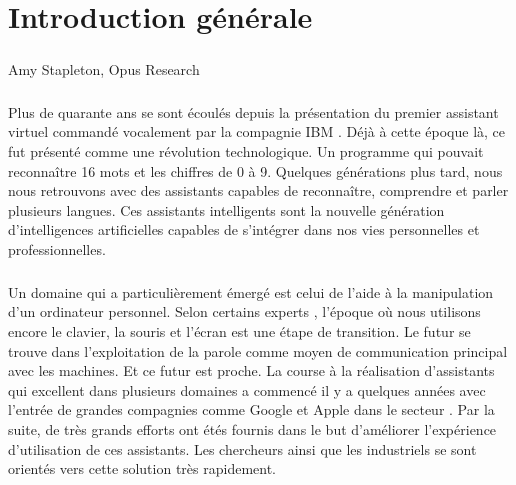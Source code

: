 \chapter*{Introduction générale}
\paragraph{}
\begin{chapquote}{Amy Stapleton, Opus Research}
\end{chapquote}

\paragraph{}
Plus de quarante ans se sont écoulés depuis la présentation du premier assistant virtuel commandé vocalement par la compagnie IBM \citep{ibm_spa}. Déjà à cette époque là, ce fut présenté comme une révolution technologique. Un programme qui pouvait reconnaître 16 mots et les chiffres de 0 à 9. Quelques générations plus tard, nous nous retrouvons avec des assistants capables de reconnaître, comprendre et parler plusieurs langues. Ces assistants intelligents sont la nouvelle génération d'intelligences artificielles capables de s'intégrer dans nos vies personnelles et professionnelles. 

\paragraph{}
Un domaine qui a particulièrement émergé est celui de l'aide à la manipulation d'un ordinateur personnel. Selon certains experts \citep{spa_arch,virtualbutler,SPA-overview}, l'époque où nous utilisons encore le clavier, la souris et l'écran est une étape de transition. Le futur se trouve dans l'exploitation de la parole comme moyen de communication principal avec les machines. Et ce futur est proche. La course à la réalisation d'assistants qui excellent dans plusieurs domaines a commencé il y a quelques années avec l'entrée de grandes compagnies comme Google et Apple dans le secteur \citep{spas_survey}. Par la suite, de très grands efforts ont étés fournis dans le but d'améliorer l'expérience d'utilisation de ces assistants. Les chercheurs ainsi que les industriels se sont orientés vers cette solution très rapidement.

